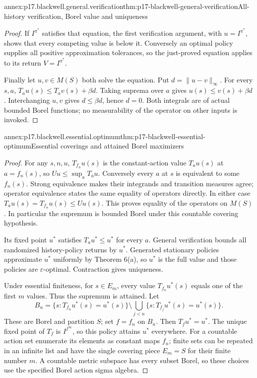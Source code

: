 \begin{annexitem}{annex:p17.blackwell.general.verification}{thm:p17-blackwell-general-verification}{All-history verification, Borel value and uniqueness}
\begin{proof}
If \(I^{\pi^*}\) satisfies that equation, the first
verification argument, with \(u=I^{\pi^*}\), shows
that every competing value is below it. Conversely an
optimal policy supplies all positive approximation
tolerances, so the just-proved equation applies to its
return \(V=I^{\pi^*}\).

Finally let \(u,v\in M(S)\) both solve the equation.
Put \(d=\|u-v\|_\infty\). For every \(s,a\),
\(T_au(s)\leq T_av(s)+\beta d\).
Taking suprema over \(a\) gives \(u(s)\leq v(s)+\beta d\).
Interchanging \(u,v\) gives \(d\leq\beta d\), hence
\(d=0\). Both integrals are of actual bounded Borel
functions; no measurability of the operator on other
inputs is invoked.
\end{proof}
\end{annexitem}

\begin{annexitem}{annex:p17.blackwell.essential.optimum}{thm:p17-blackwell-essential-optimum}{Essential coverings and attained Borel maximizers}
\begin{proof}
For any \(s,n,u\), \(T_{f_n}u(s)\) is the constant-action
value \(T_au(s)\) at \(a=f_n(s)\), so
\(Uu\leq\sup_aT_au\).
Conversely every \(a\) at \(s\) is equivalent to
some \(f_n(s)\). Strong equivalence makes their integrands
and transition measures agree; operator equivalence
states the same equality of operators directly.
In either case \(T_au(s)=T_{f_n}u(s)\leq Uu(s)\).
This proves equality of the operators on \(M(S)\).
In particular the supremum is bounded Borel under this
countable covering hypothesis.

Its fixed point \(u^*\) satisfies \(T_au^*\leq u^*\)
for every \(a\). General verification bounds all randomized
history-policy returns by \(u^*\). Generated stationary
policies approximate \(u^*\) uniformly by Theorem 6(a),
so \(u^*\) is the full value and those policies are
\(\varepsilon\)-optimal. Contraction gives uniqueness.

Under essential finiteness, for \(s\in E_m\), every value
\(T_{f_n}u^*(s)\) equals one of the first \(m\) values.
Thus the supremum is attained. Let
\[
 B_n=\{s:T_{f_n}u^*(s)=u^*(s)\}
       \setminus\bigcup_{j<n}\{s:T_{f_j}u^*(s)=u^*(s)\}.
\]
These are Borel and partition \(S\); set \(f=f_n\)
on \(B_n\). Then \(T_fu^*=u^*\).
The unique fixed point of \(T_f\) is \(I^{f^\infty}\),
so this policy attains \(u^*\) everywhere.
For a countable action set enumerate its elements as
constant maps \(f_n\); finite sets can be repeated in an
infinite list and have the single covering piece \(E_m=S\)
for their finite number \(m\). A countable metric subspace
has every subset Borel, so these choices use the specified
Borel action sigma algebra.


\end{proof}
\end{annexitem}

